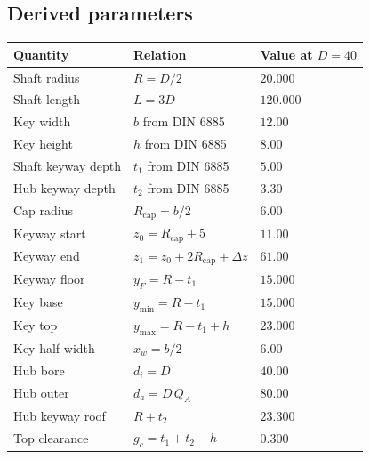\documentclass[11pt,a4paper]{article}
\begin{document}
\subsection{Derived parameters}
\begin{center}
\begin{tabular}{lll}
\toprule
Quantity & Relation & Value at $D=40$ \\
\midrule
Shaft radius & $R = D/2$ & $20.000$ \\
Shaft length & $L = 3D$ & $120.000$ \\
Key width & $b$ from DIN 6885 & $12.00$ \\
Key height & $h$ from DIN 6885 & $8.00$ \\
Shaft keyway depth & $t_1$ from DIN 6885 & $5.00$ \\
Hub keyway depth & $t_2$ from DIN 6885 & $3.30$ \\
Cap radius & $R_{\text{cap}} = b/2$ & $6.00$ \\
Keyway start & $z_0 = R_{\text{cap}} + 5$ & $11.00$ \\
Keyway end & $z_1 = z_0 + 2R_{\text{cap}} + \Delta z$ & $61.00$ \\
Keyway floor & $y_F = R - t_1$ & $15.000$ \\
Key base & $y_{\min} = R - t_1$ & $15.000$ \\
Key top & $y_{\max} = R - t_1 + h$ & $23.000$ \\
Key half width & $x_w = b/2$ & $6.00$ \\
Hub bore & $d_i = D$ & $40.00$ \\
Hub outer & $d_a = D\,Q_A$ & $80.00$ \\
Hub keyway roof & $R + t_2$ & $23.300$ \\
Top clearance & $g_c = t_1 + t_2 - h$ & $0.300$ \\
\bottomrule
\end{tabular}
\end{center}
\end{document}

